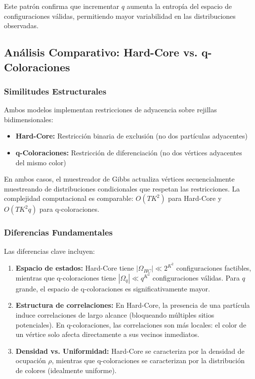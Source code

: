 Este patrón confirma que incrementar $q$ aumenta la entropía del espacio de configuraciones válidas, permitiendo mayor variabilidad en las distribuciones observadas.

\subsection{Análisis Comparativo: Hard-Core vs. q-Coloraciones}

\subsubsection{Similitudes Estructurales}

Ambos modelos implementan restricciones de adyacencia sobre rejillas bidimensionales:
\begin{itemize}
\item \textbf{Hard-Core:} Restricción binaria de exclusión (no dos partículas adyacentes)
\item \textbf{q-Coloraciones:} Restricción de diferenciación (no dos vértices adyacentes del mismo color)
\end{itemize}

En ambos casos, el muestreador de Gibbs actualiza vértices secuencialmente muestreando de distribuciones condicionales que respetan las restricciones. La complejidad computacional es comparable: $O(TK^2)$ para Hard-Core y $O(TK^2 q)$ para q-coloraciones.

\subsubsection{Diferencias Fundamentales}

Las diferencias clave incluyen:

\begin{enumerate}
\item \textbf{Espacio de estados:} Hard-Core tiene $|\Omega_{HC}| \ll 2^{K^2}$ configuraciones factibles, mientras que q-coloraciones tiene $|\Omega_q| \ll q^{K^2}$ configuraciones válidas. Para $q$ grande, el espacio de q-coloraciones es significativamente mayor.

\item \textbf{Estructura de correlaciones:} En Hard-Core, la presencia de una partícula induce correlaciones de largo alcance (bloqueando múltiples sitios potenciales). En q-coloraciones, las correlaciones son más locales: el color de un vértice solo afecta directamente a sus vecinos inmediatos.

\item \textbf{Densidad vs. Uniformidad:} Hard-Core se caracteriza por la densidad de ocupación $\rho$, mientras que q-coloraciones se caracterizan por la distribución de colores (idealmente uniforme).
\end{enumerate}

